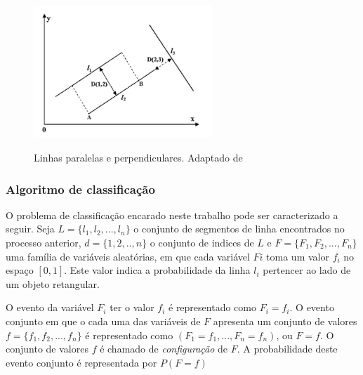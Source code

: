 
\begin{figure} [h]
\centering
\includegraphics[width = 0.6\textwidth]{figuras/linhasparal.jpg} \label{uelinha} \caption{Linhas paralelas e perpendiculares. Adaptado de \cite{mrf}}
\end{figure} 




\subsubsection{Algoritmo de classificação}

O problema de classificação encarado neste trabalho pode ser caracterizado a seguir. Seja $L = \{l_1,l_2,...,l_n\}$ o conjunto de segmentos de linha encontrados no processo anterior, $d = \{1,2,..,n\}$ o conjunto de indices de $L$ e $F = \{F_1,F_2,...,F_n\}$ uma família de variáveis aleatórias, em que cada variável $Fi$ toma um valor $f_i$ no espaço $[0,1]$. Este valor indica a probabilidade da linha $l_i$ pertencer ao lado de um objeto retangular.

O evento da variável $F_i$ ter o valor $f_i$ é representado como $F_i = f_i$. O evento conjunto em que o cada uma das variáveis de $F$ apresenta um conjunto de valores $ f = \{f_1,f_2,...,f_n\} $ é representado como $(F_1=f_1,...,F_n=f_n)$, ou $F = f$. O conjunto de valores $f$ é chamado de \textit{configuração} de $F$. A probabilidade deste evento conjunto é representada por $P(F=f)$

